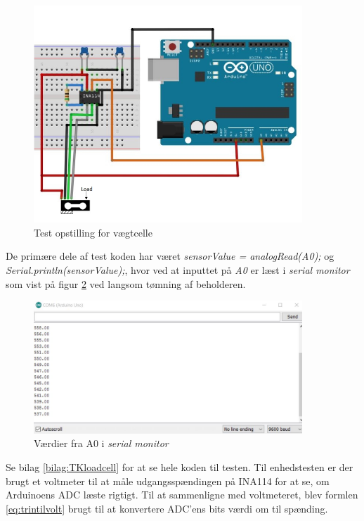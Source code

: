   \begin{figure}[H]
	\centering
	\includegraphics[width=0.9\textwidth]{billeder/Hardware/diagrammer/Drawing1.jpg}
	\caption{Test opstilling for vægtcelle}
	\label{fig:loadcelltest}
\end{figure}
De primære dele af test koden har været  \textit{sensorValue = analogRead(A0);} og \textit{Serial.println(sensorValue);}, hvor ved at inputtet på \textit{A0} er læst i \textit{serial monitor} som vist på figur \ref{fig:loadcell_test} ved langsom tømning af beholderen.

\begin{figure}[H]
	\centering
	\includegraphics[width=0.9\textwidth]{billeder/Hardware/diagrammer/loadcellunittestbits.JPG}
	\caption{Værdier fra A0 i \textit{serial monitor}}
	\label{fig:loadcell_test}
\end{figure}

 Se bilag \ref{bilag:TKloadcell} for at se hele koden til testen. Til enhedstesten er der brugt et voltmeter til at måle udgangsspændingen på INA114 for at se, om Arduinoens ADC læste rigtigt. Til at sammenligne med voltmeteret, blev formlen \ref{eq:trintilvolt} brugt til at konvertere ADC'ens bits værdi om til spænding.
 
